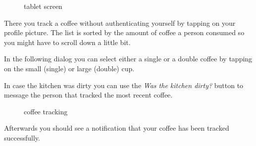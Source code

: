 \begin{figure}[htbp]
\centering
{}
\caption{tablet screen}
\end{figure}

There you track a coffee without authenticating yourself by tapping on
your profile picture. The list is sorted by the amount of coffee a
person consumed so you might have to scroll down a little bit.

In the following dialog you can select either a single or a double
coffee by tapping on the small (single) or large (double) cup.

In case the kitchen was dirty you can use the \emph{Was the kitchen
dirty?} button to message the person that tracked the most recent
coffee.

\begin{figure}[htbp]
\centering
{}
\caption{coffee tracking}
\end{figure}

Afterwards you should see a notification that your coffee has been
tracked successfully.

